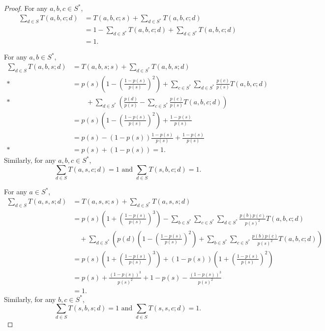 \documentclass[AHL,Unicode,longabstracts]{cedram}
\newcounter{a}
\begin{document}
\begin{proof}
For any $a,b,c \in S^*$,
\begin{align*}
\sum_{d \in S} T(a,b,c;d) & = T(a,b,c;s) + \sum_{d \in S^*} T(a,b,c;d) \\
& = 1 - \sum_{d \in S^*} T(a,b,c;d) + \sum_{d \in S^*} T(a,b,c;d) \\
& = 1.
\end{align*}

For any $a,b \in S^*$,
\begingroup
\allowdisplaybreaks
\begin{align*}
\sum_{d \in S} T(a,b,s;d) & = T(a,b,s;s) + \sum_{d \in S^*} T(a,b,s;d) \\*
& = p(s) \left(1 - \left(\frac{1-p(s)}{p(s)} \right)^2 \right) + \sum_{c \in S^*} \sum_{d \in S^*} \frac{p(c)}{p(s)}T(a,b,c;d) \\*
&\qquad+ \sum_{d \in S^*} \left(\frac{p(d)}{p(s)} - \sum_{c \in S^*} \frac{p(c)}{p(s)} T(a,b,c;d)\right) \\
& = p(s) \left(1 - \left(\frac{1-p(s)}{p(s)} \right)^2 \right) + \frac{1-p(s)}{p(s)} \\
& = p(s) - (1-p(s)) \frac{1-p(s)}{p(s)} + \frac{1-p(s)}{p(s)} \\*
& = p(s) + (1 - p(s)) =1.
\end{align*}
\endgroup
Similarly, for any $a,b,c \in S^*$,
\[
\sum_{d\in S} T(a,s,c;d) =1 \text{ and } \sum_{d\in S} T(s,b,c;d) =1.
\]

For any $a \in S^*$,
\begin{align*}
\sum_{d \in S} T(a,s,s;d) & = T(a,s,s;s) + \sum_{d \in S^*} T(a,s,s;d) \\
& = p(s) \left(1 + \left(\frac{1-p(s)}{p(s)} \right)^3 \right) - \sum_{b \in S^*} \sum_{c \in S^*} \sum_{d \in S^*} \frac{p(b)p(c)}{p(s)^2}T(a,b,c;d) \\
&\quad+ \sum_{d \in S^*} \left(p(d) \left(1 - \left(\frac{1-p(s)}{p(s)} \right)^2 \right) + \sum_{b \in S^*} \sum_{c \in S^*} \frac{p(b)p(c)}{p(s)^2}T(a,b,c;d) \right)\\
& = p(s) \left(1 + \left(\frac{1-p(s)}{p(s)} \right)^3 \right)+ (1-p(s)) \left(1 + \left(\frac{1-p(s)}{p(s)} \right)^2 \right) \\
& = p(s) + \frac{(1-p(s))^3}{p(s)^2} + 1 - p(s) - \frac{(1-p(s))^3}{p(s)^2}\\
& = 1.
\end{align*}
Similarly, for any $b,c \in S^*$,
\[
\sum_{d\in S} T(s,b,s;d) =1 \text{ and } \sum_{d\in S} T(s,s,c;d) =1.
\]


\end{proof}
\end{document}
